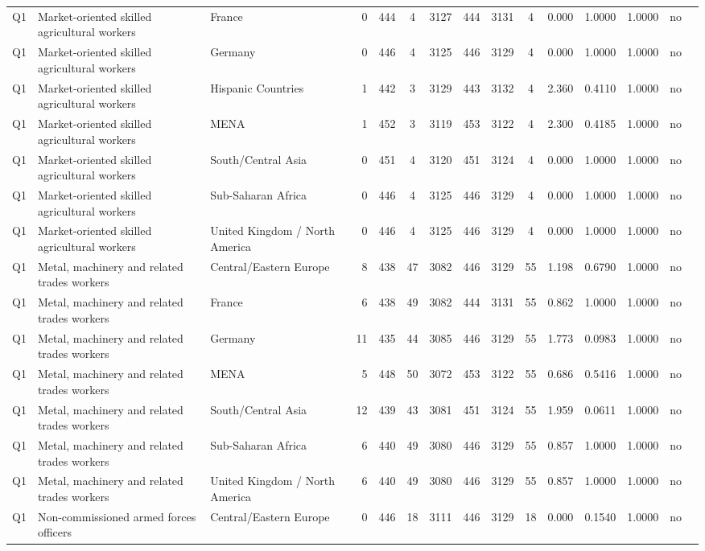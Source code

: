 \begin{longtable}{lllrcccccccccll}
Q1 & Market-oriented skilled agricultural workers & France & 0 & 444 & 4 & 3127 & 444 & 3131 & 4 & 0.000 & 1.0000 & 1.0000 & no \\
Q1 & Market-oriented skilled agricultural workers & Germany & 0 & 446 & 4 & 3125 & 446 & 3129 & 4 & 0.000 & 1.0000 & 1.0000 & no \\
Q1 & Market-oriented skilled agricultural workers & Hispanic Countries & 1 & 442 & 3 & 3129 & 443 & 3132 & 4 & 2.360 & 0.4110 & 1.0000 & no \\
Q1 & Market-oriented skilled agricultural workers & MENA & 1 & 452 & 3 & 3119 & 453 & 3122 & 4 & 2.300 & 0.4185 & 1.0000 & no \\
Q1 & Market-oriented skilled agricultural workers & South/Central Asia & 0 & 451 & 4 & 3120 & 451 & 3124 & 4 & 0.000 & 1.0000 & 1.0000 & no \\
Q1 & Market-oriented skilled agricultural workers & Sub-Saharan Africa & 0 & 446 & 4 & 3125 & 446 & 3129 & 4 & 0.000 & 1.0000 & 1.0000 & no \\
Q1 & Market-oriented skilled agricultural workers & United Kingdom / North America & 0 & 446 & 4 & 3125 & 446 & 3129 & 4 & 0.000 & 1.0000 & 1.0000 & no \\
Q1 & Metal, machinery and related trades workers & Central/Eastern Europe & 8 & 438 & 47 & 3082 & 446 & 3129 & 55 & 1.198 & 0.6790 & 1.0000 & no \\
Q1 & Metal, machinery and related trades workers & France & 6 & 438 & 49 & 3082 & 444 & 3131 & 55 & 0.862 & 1.0000 & 1.0000 & no \\
Q1 & Metal, machinery and related trades workers & Germany & 11 & 435 & 44 & 3085 & 446 & 3129 & 55 & 1.773 & 0.0983 & 1.0000 & no \\
Q1 & Metal, machinery and related trades workers & MENA & 5 & 448 & 50 & 3072 & 453 & 3122 & 55 & 0.686 & 0.5416 & 1.0000 & no \\
Q1 & Metal, machinery and related trades workers & South/Central Asia & 12 & 439 & 43 & 3081 & 451 & 3124 & 55 & 1.959 & 0.0611 & 1.0000 & no \\
Q1 & Metal, machinery and related trades workers & Sub-Saharan Africa & 6 & 440 & 49 & 3080 & 446 & 3129 & 55 & 0.857 & 1.0000 & 1.0000 & no \\
Q1 & Metal, machinery and related trades workers & United Kingdom / North America & 6 & 440 & 49 & 3080 & 446 & 3129 & 55 & 0.857 & 1.0000 & 1.0000 & no \\
Q1 & Non-commissioned armed forces officers & Central/Eastern Europe & 0 & 446 & 18 & 3111 & 446 & 3129 & 18 & 0.000 & 0.1540 & 1.0000 & no \\

\end{longtable}
